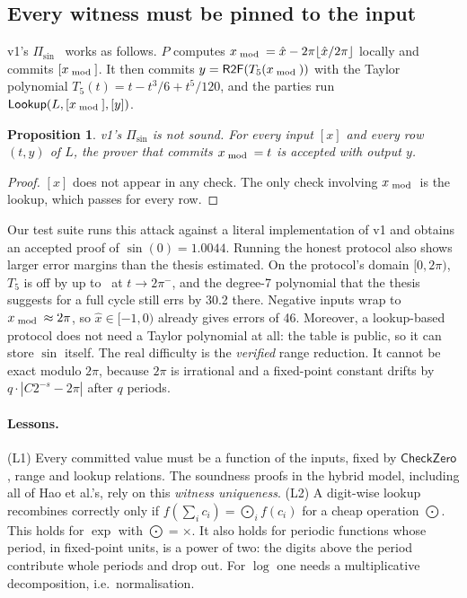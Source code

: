 \documentclass[10pt,twocolumn]{article}
\newtheorem{proposition}{Proposition}
\theoremstyle{remark}
\newcommand{\au}[1]{[#1]}
\newcommand{\RtoF}{\mathsf{R2F}}
\newcommand{\Lk}{\mathsf{Lookup}}
\newcommand{\CZ}{\mathsf{CheckZero}}
\begin{document}
\subsection{Every witness must be pinned to the input}
v1's $\Pi_{\sin}$~\cite[Fig.~4.2]{chen2025thesis} works as follows. $P$ computes
$x_{\bmod}=\hat x-2\pi\lfloor\hat x/2\pi\rfloor$ locally and commits $\au{x_{\bmod}}$. It then commits
$y=\RtoF(T_5(x_{\bmod}))$ with the Taylor polynomial $T_5(t)=t-t^3/6+t^5/120$, and the parties
run $\Lk(L,\au{x_{\bmod}},\au{y})$.

\begin{proposition}\label{prop:sin}
v1's $\Pi_{\sin}$ is not sound. For every input $\au{x}$ and every row $(t,y)$ of $L$, the prover
that commits $x_{\bmod}=t$ is accepted with output $y$.
\end{proposition}
\begin{proof}
$\au{x}$ does not appear in any check. The only check involving $x_{\bmod}$ is the lookup, which
passes for every row.
\end{proof}
Our test suite runs this attack against a literal implementation of v1 and obtains an accepted
proof of $\sin(0)=1.0044$. Running the honest protocol also shows larger error margins than the
thesis estimated. On the protocol's domain $[0,2\pi)$, $T_5$ is off by up to \VOneSinErr\ at
$t\to2\pi^-$, and the degree-7 polynomial that the thesis suggests for a full cycle still errs by
30.2 there. Negative inputs wrap to $x_{\bmod}\approx2\pi$, so $\hat x\in[-1,0)$ already gives errors
of 46. Moreover, a lookup-based protocol does not need a Taylor polynomial at all: the table is
public, so it can store $\sin$ itself. The real difficulty is the \emph{verified} range reduction.
It cannot be exact modulo $2\pi$, because $2\pi$ is irrational and a fixed-point constant drifts by
$q\cdot|C2^{-s}-2\pi|$ after $q$ periods.

\paragraph{Lessons.} (L1) Every committed value must be a function of the inputs, fixed by $\CZ$,
range and lookup relations. The soundness proofs in the hybrid model, including all of Hao et al.'s,
rely on this \emph{witness uniqueness}. (L2) A digit-wise lookup recombines
correctly only if $f(\sum_ic_i)=\bigodot_if(c_i)$ for a cheap operation $\bigodot$. This holds for
$\exp$ with $\bigodot=\times$. It also holds for periodic functions whose period, in fixed-point
units, is a power of two: the digits above the period contribute whole periods and drop out. For
$\log$ one needs a multiplicative decomposition, i.e.\ normalisation.
\end{document}
